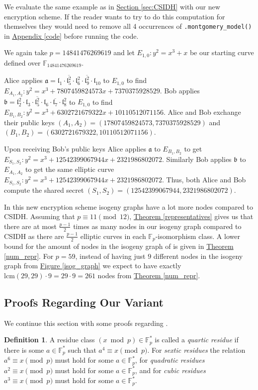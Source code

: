 \documentclass[openany, a4paper, 10pt]{book}
\theoremstyle{plain}
\theoremstyle{plain}
\theoremstyle{plain}
\theoremstyle{definition}
\newtheorem{definition}[theorem]{Definition}
\theoremstyle{plain}
\theoremstyle{definition}
\theoremstyle{remark}
\newcommand{\figref}[1]{\hyperref[#1]{Figure \ref{#1}}}
\newcommand{\theoref}[1]{\hyperref[#1]{Theorem \ref{#1}}}
\newcommand{\secref}[1]{\hyperref[#1]{Section \ref{#1}}}
\newcommand{\apref}[1]{\hyperref[#1]{Appendix \ref{#1}}}
\begin{document}
\begin{examplebox}
    We evaluate the same example as in \secref{sec:CSIDH} with our new encryption scheme.
    If the reader wants to try to do this computation for themselves they would need to remove all 4 occurrences of \verb|.montgomery_model()| in \apref{code} before running the code.

    We again take $p=14841476269619$ and let $E_{1,0}: y^2 = x^3 + x$ be our starting curve defined over $\mathbb F_{14841476269619}$.

    Alice applies $\mathfrak a = \mathfrak l_1 \cdot \overline{\mathfrak l_5^2} \cdot \mathfrak l_6^2 \cdot \overline{\mathfrak l_9^2} \cdot \mathfrak l_{10}$ to $E_{1,0}$ to find $E_{A_1, A_2}: y^2 = x^3 + 7807459824573x + 7370375928529$.
    Bob applies $\mathfrak b = \mathfrak l_2^2 \cdot \mathfrak l_3 \cdot \overline{\mathfrak l_5^2} \cdot \mathfrak l_6\cdot  \overline{\mathfrak l_7} \cdot \mathfrak l_8^2$ to $E_{1,0}$ to find $E_{B_1, B_2}: y^2 = x^3 + 6302721679322x + 10110512071156$.
    Alice and Bob exchange their public keys $(A_1, A_2) = (17807459824573, 7370375928529)$ and $(B_1, B_2) = (6302721679322, 10110512071156)$.

    Upon receiving Bob's public keys Alice applies $\mathfrak a$ to $E_{B_1, B_2}$ to get $E_{S_1, S_2}: y^2 = x^3 + 12542399067944x + 2321986802072$.
    Similarly Bob applies $\mathfrak b$ to $E_{A_1, A_2}$ to get the same elliptic curve $E_{S_1, S_2}: y^2 = x^3 + 12542399067944x + 2321986802072$.
    Thus, both Alice and Bob compute the shared secret $(S_1, S_2) = (12542399067944, 2321986802072)$.
\end{examplebox}

In this new encryption scheme isogeny graphs have a lot more nodes compared to CSIDH.
Assuming that $p \equiv 11 \pmod {12}$, \theoref{representatives} gives us that there are at most $\frac{p-1}{2}$ times as many nodes in our isogeny graph compared to CSIDH as there are $\frac{p-1}{2}$ elliptic curves in each $\mathbb F_p$-isomorphism class.
A lower bound for the amount of nodes in the isogeny graph of  is given in \theoref{num_repr}.
For $p=59$, instead of having just $9$ different nodes in the isogeny graph from \figref{isog_graph} we expect to have exactly $\mathrm{lcm}(29, 29) \cdot 9 = 29\cdot 9 = 261$ nodes from \theoref{num_repr}.


\subsection{Proofs Regarding Our Variant}
We continue this section with some proofs regarding .
\begin{definition}\label{quad_res}
    A residue class $(x \bmod p) \in \mathbb F_p^*$ is called a \textit{quartic residue} if there is some $a\in \mathbb F_p^*$ such that $a^4 \equiv x \pmod p$.
    For \textit{sextic residues} the relation $a^6 \equiv x \pmod p$ must hold for some $a \in \mathbb F_p^*$, for \textit{quadratic residues} $a^2 \equiv x \pmod p$ must hold for some $a \in \mathbb F_p^*$, and for \textit{cubic residues} $a^3 \equiv x \pmod p$ must hold for some $a \in \mathbb F_p^*$.
\end{definition}
\end{document}
